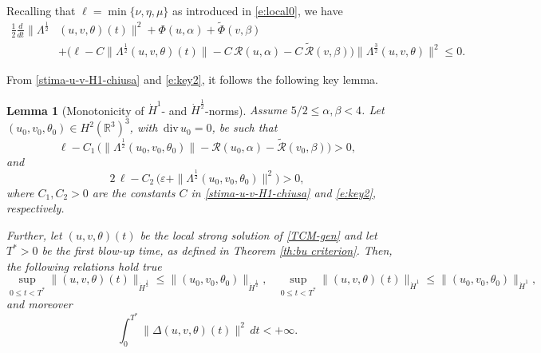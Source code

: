 \documentclass[a4paper]{article}
\newtheorem{lem}[thm]{Lemma}
\providecommand{\dv}{\,\mathrm{div}\,}
\begin{document}
Recalling that $\ell = \min \{\nu, \eta, \mu\}$ as introduced in \eqref{e:local0}, we have
%
\begin{equation} \label{e:key2}
  \begin{aligned}
    \frac{1}{2} \frac{d}{dt}  \|\Lambda^{\frac{1}{2}} & (u, v,
    \theta) (t) \|^2  +  \Phi(u,\alpha)+ \tilde \Phi (v,\beta)
    \\
    & + \big(\ell - C \|\Lambda^{\frac{1}{2}} (u, v, \theta) (t) \| -
    C\,\mathcal R(u,\alpha) -C\, \tilde{\mathcal R}(v,\beta)\big) \|\Lambda^{\frac{3}{2}} (u, v,
    \theta)\|^2 \leq 0.
  \end{aligned}
\end{equation}

From \eqref{stima-u-v-H1-chiusa} and \eqref{e:key2}, it follows the
following key lemma.

%
\begin{lem}[Monotonicity of $\dot H^1$- and $\dot H^{\frac12}$-norms]\label{lem:monotone}
  Assume $5/2 \le \alpha, \beta <4$. Let $(u_0, v_0, \theta_0)\in H^2(\mathbb{R}^3)^3$,
  with $\dv u_0 =0$, be such that
   \begin{equation} \label{e:keyii1}
   \ell - C_1\, \big(\|\Lambda^{\frac{1}{2}} (u_0, v_0, \theta_0)  \| -
    \mathcal R(u_0,\alpha) - \tilde{\mathcal R}(v_0,\beta) \big) >0,
    \end{equation}
    and
    \begin{equation} \label{e:keyii2} 2\, \ell - C_2\,\big(\varepsilon
      + \|\Lambda^{\frac{1}{2}} (u_0,v_0,\theta_0)\|^2\big) >0,
    \end{equation}
    where $C_1, C_2>0$ are the constants $C$ in
    \eqref{stima-u-v-H1-chiusa} and \eqref{e:key2}, respectively.
  
    Further, let $(u,v,\theta)(t)$ be the local strong solution of
    \eqref{TCM-gen} and let $T^\ast>0$ be  the first blow-up
    time, as defined in Theorem \ref{th:bu criterion}.
    Then, the following relations hold true
    \begin{equation}
      \label{e:monotonicity1}
      \sup_{0\leq t <T^\ast} \|(u,v,\theta)(t)\|_{\dot H^{\frac12}}
      \le \|(u_0,v_0,\theta_0)\|_{\dot H^{\frac12}}, \ \ \ \
      \sup_{0\leq t <T^\ast} \|(u,v,\theta)(t)\|_{\dot H^1} \le \|(u_0,v_0,\theta_0)\|_{\dot H^1},
    \end{equation}
    and moreover
    \begin{equation}
      \label{e:integrability1}
      \int_{0}^{T^\ast} \|\Delta (u,v,\theta)(t)\|^2\, dt < +\infty.
    \end{equation}
  \end{lem}
\end{document}
